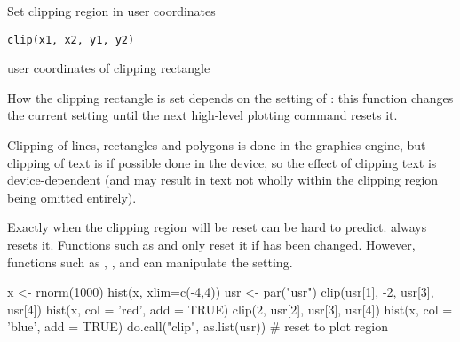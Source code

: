 %
\begin{Description}\relax
Set clipping region in user coordinates
\end{Description}
%
\begin{Usage}
\begin{verbatim}
clip(x1, x2, y1, y2)
\end{verbatim}
\end{Usage}
%
\begin{Arguments}
\begin{ldescription}
\item[\code{x1, x2, y1, y2}] user coordinates of clipping rectangle
\end{ldescription}
\end{Arguments}
%
\begin{Details}\relax
How the clipping rectangle is set depends on the setting of
: this function changes the current setting
until the next high-level plotting command resets it.

Clipping of lines, rectangles and polygons is done in the graphics
engine, but clipping of text is if possible done in the device, so the
effect of clipping text is device-dependent (and may result in text
not wholly within the clipping region being omitted entirely).

Exactly when the clipping region will be reset can be hard to
predict.   always resets it.
Functions such as  and  only
reset it if  has been changed.  However,
functions such as , ,
 and  can manipulate
the  setting.
\end{Details}
%
\begin{SeeAlso}\relax
{}
\end{SeeAlso}
%
\begin{Examples}
\begin{ExampleCode}
x <- rnorm(1000)
hist(x, xlim=c(-4,4))
usr <- par("usr")
clip(usr[1], -2, usr[3], usr[4])
hist(x, col = 'red', add = TRUE)
clip(2, usr[2], usr[3], usr[4])
hist(x, col = 'blue', add = TRUE)
do.call("clip", as.list(usr))  # reset to plot region
\end{ExampleCode}
\end{Examples}
